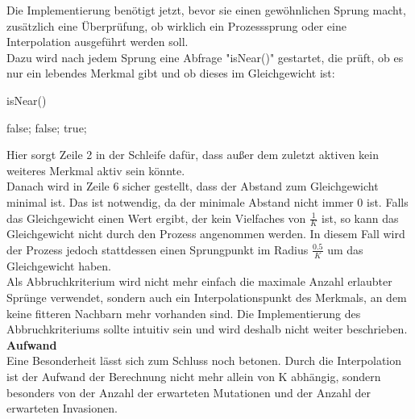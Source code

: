 \documentclass[11pt, a4paper, german]{article}
\theoremstyle{plain}
\begin{document}
	Die Implementierung benötigt jetzt, bevor sie einen gewöhnlichen Sprung macht, zusätzlich eine Überprüfung, ob wirklich ein Prozesssprung oder eine Interpolation ausgeführt werden soll.\\
	Dazu wird nach jedem Sprung eine Abfrage "{}isNear()" gestartet, die prüft, ob es nur ein lebendes Merkmal gibt und ob dieses im Gleichgewicht ist:
	\begin{algorithm}[H]
		\caption{isNear()}
		\begin{algorithmic}[1]
					\State \Return false;
				\EndIf
			\EndFor
				\State \Return false;
			\EndIf
			\State \Return true;
		\end{algorithmic}
	\end{algorithm}
	Hier sorgt Zeile 2 in der Schleife dafür, dass außer dem zuletzt aktiven kein weiteres Merkmal aktiv sein könnte.\\
	Danach wird in Zeile 6 sicher gestellt, dass der Abstand zum Gleichgewicht minimal ist. Das ist notwendig, da der minimale Abstand nicht immer $ 0 $ ist. Falls das Gleichgewicht einen Wert ergibt, der kein Vielfaches von $ \frac{1}{K} $ ist, so kann das Gleichgewicht nicht durch den Prozess angenommen werden. In diesem Fall wird der Prozess jedoch stattdessen einen Sprungpunkt im Radius $ \frac{0.5}{K} $ um das Gleichgewicht haben.\\
	Als Abbruchkriterium wird nicht mehr einfach die maximale Anzahl erlaubter Sprünge verwendet, sondern auch ein Interpolationspunkt des Merkmals, an dem keine fitteren Nachbarn mehr vorhanden sind. Die Implementierung des Abbruchkriteriums sollte intuitiv sein und wird deshalb nicht weiter beschrieben.\\
	
	\textbf{Aufwand}\\
	Eine Besonderheit lässt sich zum Schluss noch betonen. Durch die Interpolation ist der Aufwand der Berechnung nicht mehr allein von K abhängig, sondern besonders von der Anzahl der erwarteten Mutationen und der Anzahl der erwarteten Invasionen.
	
\newpage
\end{document}
